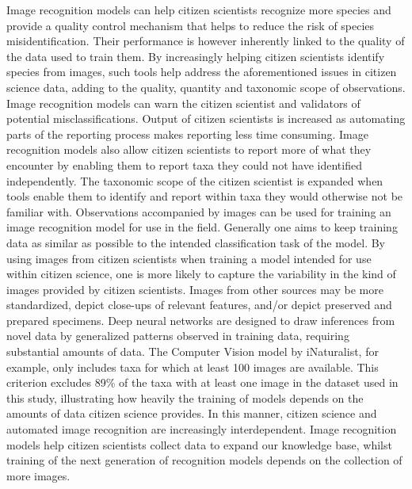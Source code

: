 \documentclass{article}
\begin{document}
Image recognition models can help citizen scientists recognize more species and provide a quality control mechanism that helps to reduce the risk of species misidentification\autocite{Christin2019}. Their performance is however inherently linked to the quality of the data used to train them. By increasingly helping citizen scientists identify species from images\autocite{Weinstein2017,Wldchen2018,Ceccaroni2019}, such tools help address the aforementioned issues in citizen science data, adding to the quality, quantity and taxonomic scope of observations. Image recognition models can warn the citizen scientist and validators of potential misclassifications. Output of citizen scientists is increased as automating parts of the reporting process makes reporting less time consuming. Image recognition models also allow citizen scientists to report more of what they encounter by enabling them to report taxa they could not have identified independently. The taxonomic scope of the citizen scientist is expanded when tools enable them to identify and report within taxa they would otherwise not be familiar with\autocite{Wldchen2018_27}. Observations accompanied by images can be used for training an image recognition model for use in the field. Generally one aims to keep training data as similar as possible to the intended classification task of the model\autocite{Goodfellow-et-al-2016}. By using images from citizen scientists when training a model intended for use within citizen science, one is more likely to capture the variability in the kind of images provided by citizen scientists. Images from other sources may be more standardized, depict close-ups of relevant features, and/or depict preserved and prepared specimens. Deep neural networks are designed to draw inferences from novel data by generalized patterns observed in training data\autocite{Goodfellow-et-al-2016}, requiring substantial amounts of data. The Computer Vision model by iNaturalist, for example, only includes taxa for which at least 100 images are available\autocite{iNatBlog}. This criterion excludes 89\% of the taxa with at least one image in the dataset used in this study, illustrating how heavily the training of models depends on the amounts of data citizen science provides. In this manner, citizen science and automated image recognition are increasingly interdependent. Image recognition models help citizen scientists collect data to expand our knowledge base, whilst training of the next generation of recognition models depends on the collection of more images.
\end{document}
